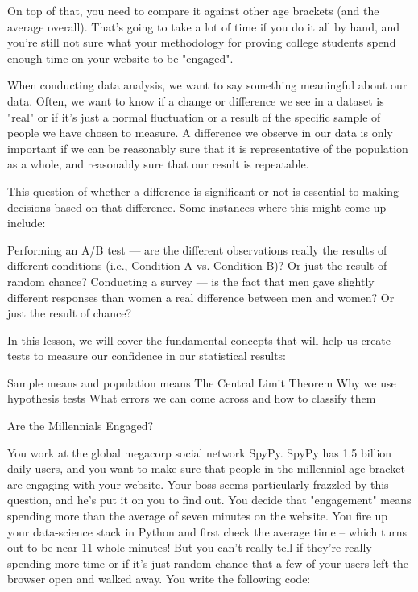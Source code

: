 \documentclass{journal}
\begin{document}
On top of that, you need to compare it against other age brackets (and the average overall). That's going to take a lot of time if you do it all by hand, and you're still not sure what your methodology for proving college students spend enough time on your website to be "engaged".

When conducting data analysis, we want to say something meaningful about our data. Often, we want to know if a change or difference we see in a dataset is "real" or if it’s just a normal fluctuation or a result of the specific sample of people we have chosen to measure. A difference we observe in our data is only important if we can be reasonably sure that it is representative of the population as a whole, and reasonably sure that our result is repeatable.

This question of whether a difference is significant or not is essential to making decisions based on that difference. Some instances where this might come up include:

    Performing an A/B test — are the different observations really the results of different conditions (i.e., Condition A vs. Condition B)? Or just the result of random chance?
    Conducting a survey — is the fact that men gave slightly different responses than women a real difference between men and women? Or just the result of chance?

In this lesson, we will cover the fundamental concepts that will help us create tests to measure our confidence in our statistical results:

    Sample means and population means
    The Central Limit Theorem
    Why we use hypothesis tests
    What errors we can come across and how to classify them




Are the Millennials Engaged?

You work at the global megacorp social network SpyPy. SpyPy has 1.5 billion daily users, and you want to make sure that people in the millennial age bracket are engaging with your website. Your boss seems particularly frazzled by this question, and he's put it on you to find out. You decide that "engagement" means spending more than the average of seven minutes on the website. You fire up your data-science stack in Python and first check the average time -- which turns out to be near 11 whole minutes! But you can't really tell if they're really spending more time or if it's just random chance that a few of your users left the browser open and walked away. You write the following code:
\end{document}
